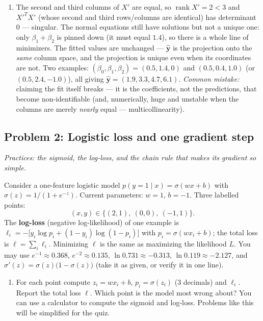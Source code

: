 \documentclass[
  11pt,
]{article}
\providecommand{\tightlist}{%
  \setlength{\itemsep}{0pt}\setlength{\parskip}{0pt}}
\newcommand{\answerpage}{\clearpage}
\begin{document}
\begin{solutionbox}
\begin{enumerate}
  \(\Vert\mathbf y - X\boldsymbol\beta\Vert^2\).
\item
  The second and third columns of \(X'\) are equal, so
  \(\operatorname{rank}X' = 2 < 3\) and \(X'^TX'\) (whose second and
  third rows/columns are identical) has determinant \(0\) --- singular.
  The normal equations still have solutions but not a unique one: only
  \(\beta_1 + \beta_2\) is pinned down (it must equal \(1.4\)), so there
  is a whole line of minimizers. The fitted values are unchanged ---
  \(\hat{\mathbf y}\) is the projection onto the \emph{same} column
  space, and the projection is unique even when its coordinates are not.
  Two examples: \((\beta_0,\beta_1,\beta_2) =
  (0.5, 1.4, 0)\) and \((0.5, 0.4, 1.0)\) (or \((0.5, 2.4, -1.0)\)), all
  giving \(\hat{\mathbf y} = (1.9,3.3,4.7,6.1)\). \emph{Common mistake:}
  claiming the fit itself breaks --- it is the coefficients, not the
  predictions, that become non-identifiable (and, numerically, huge and
  unstable when the columns are merely \emph{nearly} equal ---
  multicollinearity).
\end{enumerate}

\end{solutionbox}

\answerpage

\subsection{Problem 2: Logistic loss and one gradient
step}\label{problem-2-logistic-loss-and-one-gradient-step}

\emph{Practices: the sigmoid, the log-loss, and the chain rule that
makes its gradient so simple.}

Consider a one-feature logistic model
\(p(y{=}1 \mid x) = \sigma(wx + b)\) with \(\sigma(z) = 1/(1+e^{-z})\).
Current parameters: \(w = 1\), \(b = -1\). Three labelled points:
\[(x, y) \in \{(2, 1),\ (0, 0),\ (-1, 1)\}.\] The \textbf{log-loss}
(negative log-likelihood) of one example is
\(\ell_i = -\big[y_i\log p_i + (1-y_i)\log(1-p_i)\big]\) with
\(p_i = \sigma(wx_i + b)\); the total loss is \(\ell = \sum_i \ell_i\).
Minimizing \(\ell\) is the same as maximizing the likelihood \(L\). You
may use \(e^{-1}\approx0.368\), \(e^{-2}\approx0.135\),
\(\ln 0.731\approx-0.313\), \(\ln 0.119\approx-2.127\), and
\(\sigma'(z) = \sigma(z)\big(1-\sigma(z)\big)\) (take it as given, or
verify it in one line).

\begin{enumerate}
\def\labelenumi{(\alph{enumi})}
\tightlist
\item
  For each point compute \(z_i = wx_i + b\), \(p_i = \sigma(z_i)\) (3
  decimals) and \(\ell_i\). Report the total loss \(\ell\). Which point
  is the model most wrong about? You can use a calculator to compute the
  sigmoid and log-loss. Problems like this will be simplified for the
  quiz.
\end{enumerate}
\end{document}
